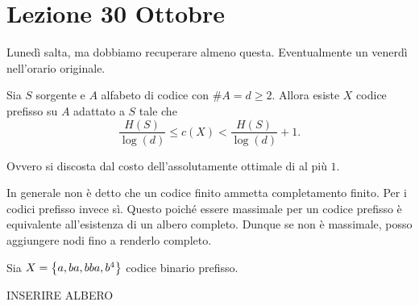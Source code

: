 \chapter{Lezione 30 Ottobre}

Lunedì salta, ma dobbiamo recuperare almeno questa.
Eventualmente un venerdì nell'orario originale.

\begin{theorem}{}
  Sia \(S\) sorgente e \(A\) alfabeto di codice con \(\# A = d \geq 2\).
  Allora esiste \(X\) codice prefisso su \(A\) adattato a \(S\) tale che
  \[\frac{H(S)}{\log\left(d\right)} \leq c(X) < \frac{H(S)}{\log\left(d\right)} + 1.\]
\end{theorem}

Ovvero si discosta dal costo dell'assolutamente ottimale di al più \(1\).
\begin{observation}{}
  In generale non è detto che un codice finito ammetta completamento finito.
  Per i codici prefisso invece sì. Questo poiché essere massimale per un codice prefisso è equivalente all'esistenza di un albero completo.
  Dunque se non è massimale, posso aggiungere nodi fino a renderlo completo.
\end{observation}

\begin{example}{}
  Sia \(X = \set{a,ba,bba,b^4}\) codice binario prefisso.
  

  INSERIRE ALBERO
\end{example}

